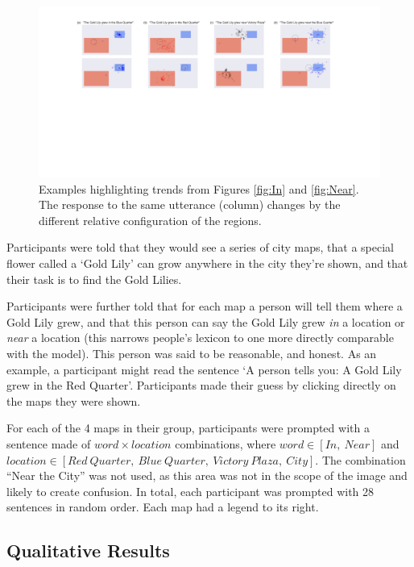 \documentclass[10pt,letterpaper]{article}
\begin{document}
\begin{figure}[!t]
\center
\includegraphics[width=\textwidth]{figures/results1.pdf}
\caption{Examples highlighting trends from Figures \ref{fig:In} and \ref{fig:Near}. The response to the same utterance (column) changes by the different relative configuration of the regions.}
\label{fig:zoomIn}
\end{figure}

Participants were told that they would see a series of city maps, that a special flower called a `Gold Lily' can grow anywhere in the city they're shown, and that their task is to find the Gold Lilies. 

Participants were further told that for each map a person will tell them where a Gold Lily grew, and that this person can say the Gold Lily grew \textit{in} a location or \textit{near} a location (this narrows people's lexicon to one more directly comparable with the model). This person was said to be reasonable, and honest. As an example, a participant might read the sentence `A person tells you: A Gold Lily grew in the Red Quarter'. Participants made their guess by clicking directly on the maps they were shown.

For each of the 4 maps in their group, participants were prompted with a sentence made of $word \times location$ combinations, where $word \in [In,\ Near]$ and $location \in [Red\ Quarter,\ Blue\ Quarter,\ Victory\ Plaza,\ City]$. The combination ``Near the City'' was not used, as this area was not in the scope of the image and likely to create confusion. In total, each participant was prompted with 28 sentences in random order. Each map had a legend to its right. 

\subsection{Qualitative Results} 
\end{document}
